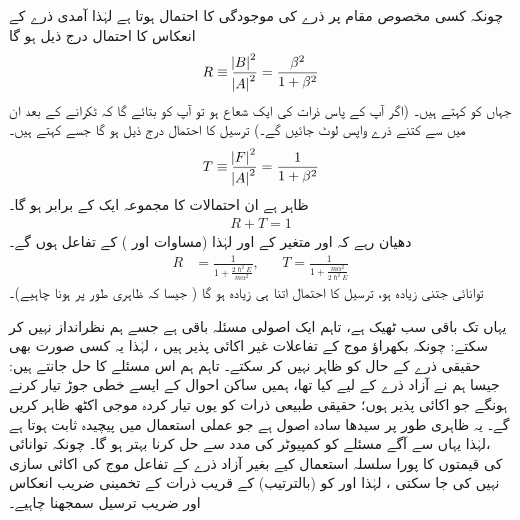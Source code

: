 چونکہ کسی مخصوص مقام پر ذرے کی موجودگی کا احتمال  ہوتا ہے لہٰذا آمدی ذرے کے انعکاس کا   احتمال درج ذیل ہو گا 
\begin{align}
R\equiv \frac{\abs B^{2}}{\abs A^{2}}=\frac{\beta^{2}}{1+\beta^{2}}
\end{align}
جہاں  کو  کہتے ہیں۔ (اگر آپ کے پاس ذرات کی ایک شعاع ہو تو  آپ کو بتائے گا کہ ٹکرانے کے بعد ان میں سے کتنے ذرے  واپس لوٹ جائیں گے۔)  ترسیل کا احتمال درج ذیل ہو گا جسے کہتے ہیں۔
\begin{align}
T\equiv \frac{\abs F^{2}}{\abs A^{2}}=\frac{1}{1+\beta^{2}}
\end{align}
 ظاہر ہے ان احتمالات  کا مجموعہ ایک  کے برابر  ہو گا۔
 \begin{align}
 R+T=1
 \end{align}
 دھیان رہے کہ  اور  متغیر  کے اور لہٰذا (مساوات  اور )   کے تفاعل ہوں گے۔
 \begin{align}\label{مساوات_شروڈنگر_انعکاس_ترسیل_مستقل}
 R&=\frac{1}{1+\tfrac{2\hslash^{2}E}{m\alpha^{2}}},&& T =\frac{1}{1+\tfrac{m\alpha^{2}}{2\hslash^{2}E}}
 \end{align} 
توانائی جتنی زیادہ ہو، ترسیل کا احتمال اتنا   ہی زیادہ ہو گا ( جیسا کہ ظاہری طور پر ہونا چاہیے)۔ 
 
 یہاں تک باقی سب ٹھیک ہے،  تاہم ایک اصولی مسئلہ باقی ہے جسے ہم نظرانداز نہیں کر سکتے: چونکہ بکھراؤ موج کے تفاعلات غیر اکائی پذیر ہیں ، لہٰذا یہ کسی صورت بھی حقیقی ذرے کے حال کو ظاہر نہیں کر سکتے۔ تاہم ہم اس مسئلے کا حل جانتے ہیں:  جیسا ہم نے آزاد ذرے  کے لیے کیا تھا، ہمیں ساکن احوال کے ایسے خطی جوڑ تیار کرنے ہونگے جو اکائی پذیر ہوں؛  حقیقی طبیعی ذرات کو یوں تیار کردہ موجی اکٹھ ظاہر کریں  گے۔ یہ ظاہری طور پر سیدھا سادہ اصول ہے جو عملی استعمال میں پیچیدہ ثابت ہوتا ہے ،لہٰذا یہاں سے آگے مسئلے کو کمپیوٹر کی مدد سے حل کرنا بہتر ہو گا۔ چونکہ توانائی کی قیمتوں کا پورا سلسلہ استعمال کیے بغیر آزاد ذرے کے تفاعل موج کی اکائی سازی نہیں کی جا سکتی ، لہٰذا  اور  کو (بالترتیب)  کے قریب ذرات کے  تخمینی  ضریب انعکاس اور ضریب  ترسیل سمجھنا چاہیے۔ 
 
